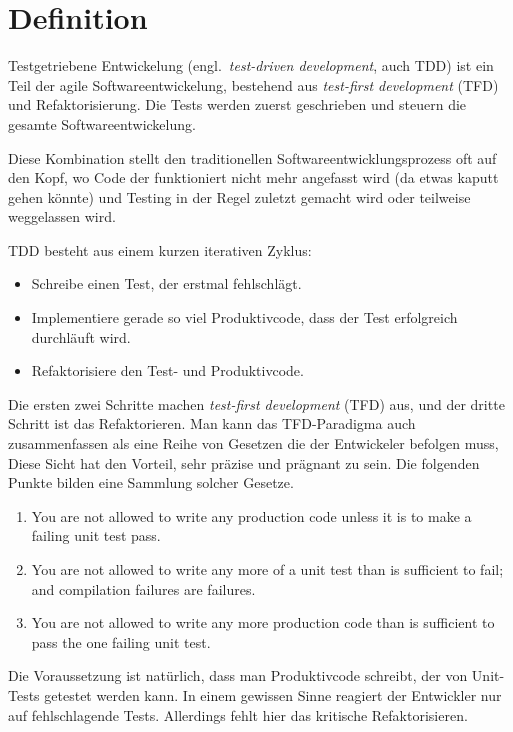\documentclass[a4paper,10pt]{scrartcl}
\newcommand{\bmn}{\marginpar{Benjamin\\Morgan}}
\begin{document}
\section{Definition}\label{Definition}\bmn
Testgetriebene Entwickelung (engl.\ \emph{test-driven development}, auch TDD)
ist ein Teil der agile Softwareentwickelung, bestehend aus \emph{test-first
development} (TFD) und Refaktorisierung. Die Tests werden zuerst geschrieben und
steuern die gesamte Softwareentwickelung. \cite{AgileData, itAgile}

Diese Kombination stellt den traditionellen Softwareentwicklungsprozess oft auf
den Kopf, wo Code der funktioniert nicht mehr angefasst wird (da etwas kaputt
gehen könnte) und Testing in der Regel zuletzt gemacht wird oder teilweise
weggelassen wird.

TDD besteht aus einem kurzen iterativen Zyklus:

\begin{itemize}
    \item Schreibe einen Test, der erstmal fehlschlägt.
    \item Implementiere gerade so viel Produktivcode, dass der Test erfolgreich
        durchläuft wird.
    \item Refaktorisiere den Test- und Produktivcode. \cite{itAgile}
\end{itemize}

Die ersten zwei Schritte machen \emph{test-first development} (TFD) aus, und
der dritte Schritt ist das Refaktorieren.  Man kann das TFD-Paradigma auch
zusammenfassen als eine Reihe von Gesetzen die der Entwickeler befolgen muss,
Diese Sicht hat den Vorteil, sehr präzise und prägnant zu sein.
Die folgenden Punkte bilden eine Sammlung solcher Gesetze.

\begin{enumerate}
    \item You are not allowed to write any production code unless it is to make
        a failing unit test pass.
    \item You are not allowed to write any more of a unit test than is
        sufficient to fail; and compilation failures are failures.
    \item You are not allowed to write any more production code than is
        sufficient to pass the one failing unit test. \cite{UncleBob}
\end{enumerate}

Die Voraussetzung ist natürlich, dass man Produktivcode schreibt, der von
Unit-Tests getestet werden kann. In einem gewissen Sinne reagiert der
Entwickler nur auf fehlschlagende Tests. Allerdings fehlt hier das kritische
Refaktorisieren.
\end{document}
